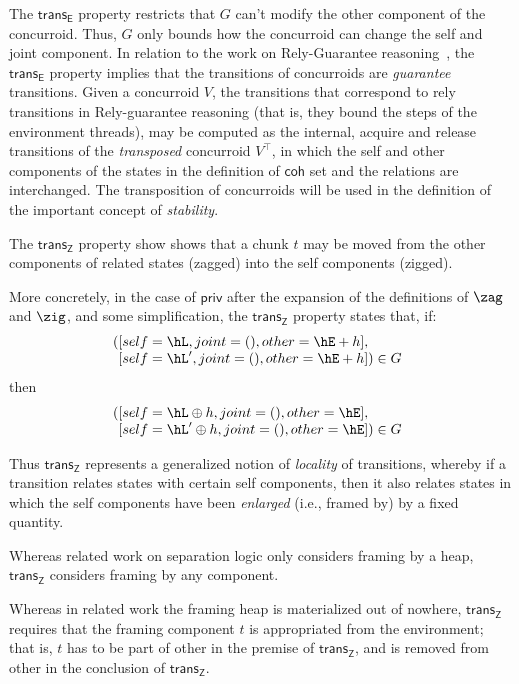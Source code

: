 The $\mathsf{trans_E}$ property restricts that $G$ can't modify the
other component of the concurroid. Thus, $G$ only bounds how the
concurroid can change the self and joint component. In relation to the
work on Rely-Guarantee
reasoning~\cite{Jones:IFIP83,Feng-al:ESOP07,Feng:POPL09,Vafeiadis-Parkinson:CONCUR07},
the $\mathsf{trans_E}$ property implies that the transitions of
concurroids are \emph{guarantee} transitions.
%
Given a concurroid $V$, the transitions that correspond to rely
transitions in Rely-guarantee reasoning (that is, they bound the steps
of the environment threads), may be computed as the internal, acquire
and release transitions of the \emph{transposed} concurroid $V^\top$,
in which the self and other components of the states in the definition
of $\mathsf{coh}$ set and the relations are interchanged. The transposition of concurroids will be used in
the definition of the important concept of \emph{stability}.

The $\mathsf{trans_Z}$ property show shows that a chunk $t$ may be
moved from the other components of related states (zagged) into the
self components (zigged). 

More concretely, in the case of $\mathsf{priv}$ after the expansion of
the definitions of $\zag$ and $\zig$, and some simplification, the
$\mathsf{trans_Z}$ property states that, if:
\[
(\!\!\!\begin{array}[t]{l}
  [self=\hL, joint=(),other=\hE + h], \\\relax
  [self=\hL', joint=(),other=\hE + h]) \in G
 \end{array}
\]
then 
\[
(\!\!\!\begin{array}[t]{l}
 [self=\hL \oplus h, joint=(),other=\hE],\\\relax
 [self=\hL' \oplus h, joint=(),other=\hE]) \in G
\end{array}
\]

Thus $\mathsf{trans_Z}$ represents a generalized notion of
\emph{locality} of transitions, whereby if a transition relates states
with certain self components, then it also relates states in which the
self components have been \emph{enlarged} (i.e., framed by) by a fixed
quantity.

Whereas related work on separation logic only considers framing by a
heap, $\mathsf{trans_Z}$ considers framing by any component.

Whereas in related work the framing heap is materialized out of
nowhere, $\mathsf{trans_Z}$ requires that the framing component $t$ is
appropriated from the environment; that is, $t$ has to be part of
other in the premise of $\mathsf{trans_Z}$, and is removed from other
in the conclusion of $\mathsf{trans_Z}$.

